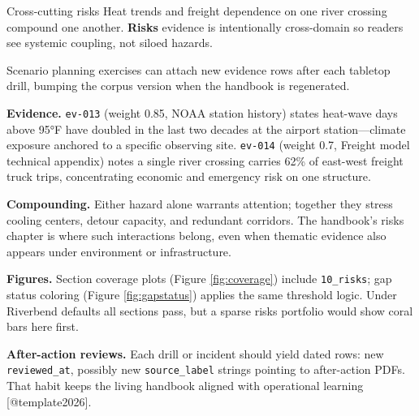 \documentclass[
  ignorenonframetext,
]{beamer}
\author{\texorpdfstring{}{}}
\date{}
\begin{document}
\begin{frame}[fragile]{Cross-cutting risks}
\protect{}\label{cross-cutting-risks}
Heat trends and freight dependence on one river crossing compound one
another. \textbf{Risks} evidence is intentionally cross-domain so
readers see systemic coupling, not siloed hazards.

Scenario planning exercises can attach new evidence rows after each
tabletop drill, bumping the corpus version when the handbook is
regenerated.

\textbf{Evidence.} \texttt{ev-013} (weight 0.85, NOAA station history)
states heat-wave days above 95°F have doubled in the last two decades at
the airport station---climate exposure anchored to a specific observing
site. \texttt{ev-014} (weight 0.7, Freight model technical appendix)
notes a single river crossing carries 62\% of east-west freight truck
trips, concentrating economic and emergency risk on one structure.

\textbf{Compounding.} Either hazard alone warrants attention; together
they stress cooling centers, detour capacity, and redundant corridors.
The handbook's risks chapter is where such interactions belong, even
when thematic evidence also appears under environment or infrastructure.

\textbf{Figures.} Section coverage plots (Figure \ref{fig:coverage})
include \texttt{10\_risks}; gap status coloring (Figure
\ref{fig:gapstatus}) applies the same threshold logic. Under Riverbend
defaults all sections pass, but a sparse risks portfolio would show
coral bars here first.

\textbf{After-action reviews.} Each drill or incident should yield dated
rows: new \texttt{reviewed\_at}, possibly new \texttt{source\_label}
strings pointing to after-action PDFs. That habit keeps the living
handbook aligned with operational learning {[}@template2026{]}.
\end{frame}
\end{document}
